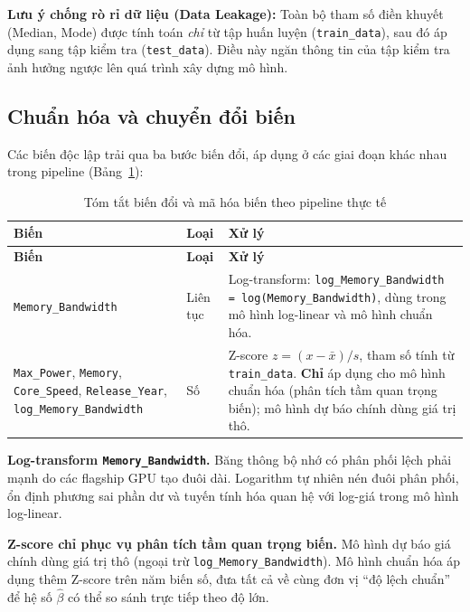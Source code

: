 \noindent\textbf{Lưu ý chống rò rỉ dữ liệu (Data Leakage):} Toàn bộ tham số điền khuyết (Median, Mode) được tính toán \emph{chỉ} từ tập huấn luyện (\texttt{train\_data}), sau đó áp dụng sang tập kiểm tra (\texttt{test\_data}). Điều này ngăn thông tin của tập kiểm tra ảnh hưởng ngược lên quá trình xây dựng mô hình.

\subsection{Chuẩn hóa và chuyển đổi biến}

Các biến độc lập trải qua ba bước biến đổi, áp dụng ở các giai đoạn khác nhau trong pipeline (Bảng~\ref{tab:var_encoding}):

\renewcommand{\arraystretch}{1.3}
\small
\setlength\LTleft{\fill}
\setlength\LTright{\fill}
\begin{longtable}{|p{4.8cm}|p{2.0cm}|p{7.4cm}|}
\caption{Tóm tắt biến đổi và mã hóa biến theo pipeline thực tế}
\label{tab:var_encoding} \\
\hline
\textbf{Biến} & \textbf{Loại} & \textbf{Xử lý} \\
\hline
\endfirsthead
\hline
\textbf{Biến} & \textbf{Loại} & \textbf{Xử lý} \\
\hline
\endhead
\hline
\endlastfoot
\texttt{Memory\_Bandwidth} & Liên tục & Log-transform: \texttt{log\_Memory\_Bandwidth = log(Memory\_Bandwidth)}, dùng trong mô hình log-linear và mô hình chuẩn hóa. \\
\hline
\texttt{Max\_Power}, \texttt{Memory}, \texttt{Core\_Speed}, \texttt{Release\_Year}, \texttt{log\_Memory\_Bandwidth} & Số & Z-score $z = (x - \bar{x})/s$, tham số tính từ \texttt{train\_data}. \textbf{Chỉ} áp dụng cho mô hình chuẩn hóa (phân tích tầm quan trọng biến); mô hình dự báo chính dùng giá trị thô. \\
\hline
\end{longtable}
\normalsize

\textbf{Log-transform \texttt{Memory\_Bandwidth}.} Băng thông bộ nhớ có phân phối lệch phải mạnh do các flagship GPU tạo đuôi dài. Logarithm tự nhiên nén đuôi phân phối, ổn định phương sai phần dư và tuyến tính hóa quan hệ với log-giá trong mô hình log-linear.

\textbf{Z-score chỉ phục vụ phân tích tầm quan trọng biến.} Mô hình dự báo giá chính dùng giá trị thô (ngoại trừ \texttt{log\_Memory\_Bandwidth}). Mô hình chuẩn hóa áp dụng thêm Z-score trên năm biến số, đưa tất cả về cùng đơn vị ``độ lệch chuẩn'' để hệ số $\hat{\beta}$ có thể so sánh trực tiếp theo độ lớn.

